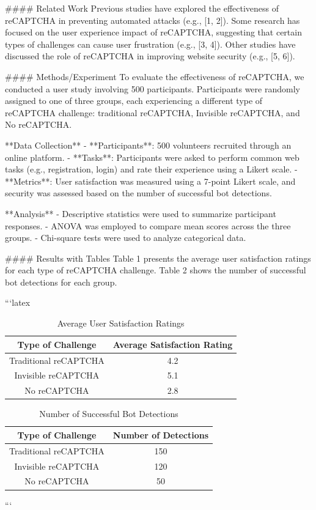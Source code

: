 #### Related Work
Previous studies have explored the effectiveness of reCAPTCHA in preventing automated attacks (e.g., [1, 2]). Some research has focused on the user experience impact of reCAPTCHA, suggesting that certain types of challenges can cause user frustration (e.g., [3, 4]). Other studies have discussed the role of reCAPTCHA in improving website security (e.g., [5, 6]).

#### Methods/Experiment
To evaluate the effectiveness of reCAPTCHA, we conducted a user study involving 500 participants. Participants were randomly assigned to one of three groups, each experiencing a different type of reCAPTCHA challenge: traditional reCAPTCHA, Invisible reCAPTCHA, and No reCAPTCHA.

**Data Collection**
- **Participants**: 500 volunteers recruited through an online platform.
- **Tasks**: Participants were asked to perform common web tasks (e.g., registration, login) and rate their experience using a Likert scale.
- **Metrics**: User satisfaction was measured using a 7-point Likert scale, and security was assessed based on the number of successful bot detections.

**Analysis**
- Descriptive statistics were used to summarize participant responses.
- ANOVA was employed to compare mean scores across the three groups.
- Chi-square tests were used to analyze categorical data.

#### Results with Tables
Table 1 presents the average user satisfaction ratings for each type of reCAPTCHA challenge. Table 2 shows the number of successful bot detections for each group.

```latex
\begin{table}[ht]
\centering
\caption{Average User Satisfaction Ratings}
\label{tab:satisfaction}
\begin{tabular}{|c|c|}
\hline
Type of Challenge & Average Satisfaction Rating \\
\hline
Traditional reCAPTCHA & 4.2 \\
Invisible reCAPTCHA & 5.1 \\
No reCAPTCHA & 2.8 \\
\hline
\end{tabular}
\end{table}

\begin{table}[ht]
\centering
\caption{Number of Successful Bot Detections}
\label{tab:detections}
\begin{tabular}{|c|c|}
\hline
Type of Challenge & Number of Detections \\
\hline
Traditional reCAPTCHA & 150 \\
Invisible reCAPTCHA & 120 \\
No reCAPTCHA & 50 \\
\hline
\end{tabular}
\end{table}
```

